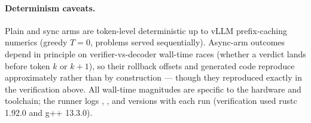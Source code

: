 \paragraph{Determinism caveats.} Plain and sync arms are
token-level deterministic up to vLLM prefix-caching numerics
(greedy $T\!=\!0$, problems served sequentially). Async-arm
outcomes depend in principle on verifier-vs-decoder wall-time
races (whether a verdict lands before token $k$ or $k{+}1$), so
their rollback offsets and generated code reproduce approximately
rather than by construction --- though they reproduced exactly in
the verification above. All wall-time magnitudes are specific to
the hardware and toolchain; the runner logs ,
, and  versions with each run
(verification used rustc 1.92.0 and g{+}{+} 13.3.0).
